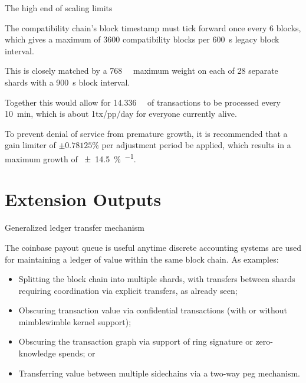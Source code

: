 \documentclass[10pt]{beamer}
\begin{document}

\begin{frame}{The high end of scaling limits}

  The compatibility chain's block timestamp must tick forward once
  every 6 blocks, which gives a maximum of \num{3600} compatibility
  blocks per \SI{600}{\second} legacy block interval.

  This is closely matched by a \SI{768}{\mega\weight} maximum weight
  on each of \num{28} separate shards with a \SI{900}{\second} block
  interval.

  Together this would allow for \SI{14.336}{\giga\weight} of
  transactions to be processed every \SI{10}{\minute}, which is about
  \num{1}tx/pp/day for everyone currently alive.

  To prevent denial of service from premature growth, it is
  recommended that a gain limiter of $\pm 0.78125\%$ per adjustment
  period be applied, which results in a maximum growth of
  \SI[per-mode=symbol]{\pm 14.5}{\percent\per\year}.

\end{frame}

\section{Extension Outputs}

\begin{frame}{Generalized ledger transfer mechanism}

  The coinbase payout queue is useful anytime discrete accounting
  systems are used for maintaining a ledger of value within the same
  block chain.  As examples:

  \begin{itemize}

  \item Splitting the block chain into multiple shards, with transfers
    between shards requiring coordination via explicit transfers, as
    already seen;

  \item Obscuring transaction value via confidential transactions
    (with or without mimblewimble kernel support);

  \item Obscuring the transaction graph via support of ring signature
    or zero-knowledge spends; or

  \item Transferring value between multiple sidechains via a two-way
    peg mechanism.

  \end{itemize}

\end{frame}
\end{document}
